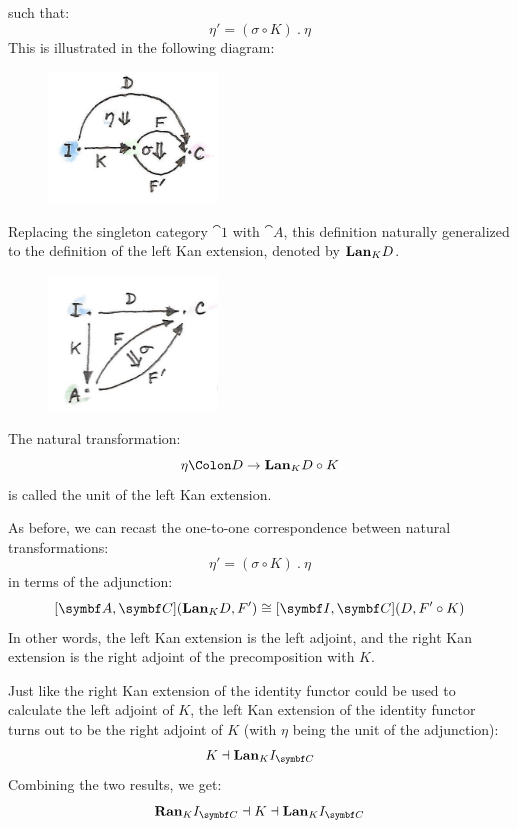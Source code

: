 \noindent
such that:
\[\eta' = (\sigma \circ K)\ .\ \eta\]
This is illustrated in the following diagram:

\begin{figure}[H]
  \centering
  \includegraphics[width=0.4\textwidth]{images/kan112.jpg}
\end{figure}

\noindent
Replacing the singleton category $\cat{1}$ with $\cat{A}$, this
definition naturally generalized to the definition of the left Kan
extension, denoted by $\mathbf{Lan}_{K}D$.

\begin{figure}[H]
  \centering
  \includegraphics[width=0.4\textwidth]{images/kan12.jpg}
\end{figure}

\noindent
The natural transformation:
\[\eta \Colon D \to \Lan_{K}D \circ K\]
is called the unit of the left Kan extension.

As before, we can recast the one-to-one correspondence between natural
transformations:
\[\eta' = (\sigma \circ K)\ .\ \eta\]
in terms of the adjunction:
\[[\cat{A}, \cat{C}](\Lan_{K}D, F') \cong [\cat{I}, \cat{C}](D, F' \circ K)\]
In other words, the left Kan extension is the left adjoint, and the
right Kan extension is the right adjoint of the precomposition with
$K$.

Just like the right Kan extension of the identity functor could be used
to calculate the left adjoint of $K$, the left Kan extension of
the identity functor turns out to be the right adjoint of $K$
(with $\eta$ being the unit of the adjunction):
\[K \dashv \Lan_{K}I_{\cat{C}}\]
Combining the two results, we get:
\[\Ran_{K}I_{\cat{C}} \dashv K \dashv \Lan_{K}I_{\cat{C}}\]

